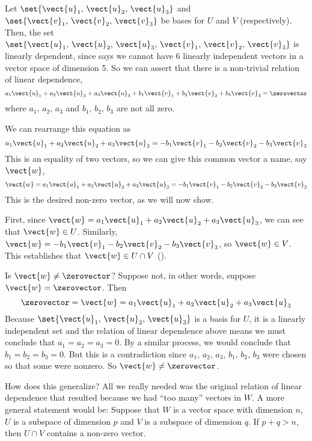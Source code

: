 Let $\set{\vect{u}_1,\,\vect{u}_2,\,\vect{u}_3}$ and $\set{\vect{v}_1,\,\vect{v}_2,\,\vect{v}_3}$ be bases for $U$ and $V$ (respectively).  Then, the set $\set{\vect{u}_1,\,\vect{u}_2,\,\vect{u}_3,\,\vect{v}_1,\,\vect{v}_2,\,\vect{v}_3}$ is linearly dependent, since  says we cannot have 6 linearly independent vectors in a vector space of dimension 5.  So we can assert that there is a non-trivial relation of linear dependence,
%
\begin{equation*}
a_1\vect{u}_1+a_2\vect{u}_2+a_3\vect{u}_3+b_1\vect{v}_1+b_2\vect{v}_2+b_3\vect{v}_3=\zerovector
\end{equation*}
%
where $a_1,\,a_2,\,a_3$ and $b_1,\,b_2,\,b_3$ are not all zero.\par
%
We can rearrange this equation as
%
\begin{equation*}
a_1\vect{u}_1+a_2\vect{u}_2+a_3\vect{u}_3=-b_1\vect{v}_1-b_2\vect{v}_2-b_3\vect{v}_3
\end{equation*}
%
This is an equality of two vectors, so we can give this common vector a name, say $\vect{w}$, 
%
\begin{equation*}
\vect{w}=a_1\vect{u}_1+a_2\vect{u}_2+a_3\vect{u}_3=-b_1\vect{v}_1-b_2\vect{v}_2-b_3\vect{v}_3
\end{equation*}
%
This is the desired non-zero vector, as we will now show.\par
%
First, since $\vect{w}=a_1\vect{u}_1+a_2\vect{u}_2+a_3\vect{u}_3$, we can see that $\vect{w}\in U$.  Similarly, $\vect{w}=-b_1\vect{v}_1-b_2\vect{v}_2-b_3\vect{v}_3$, so $\vect{w}\in V$.  This establishes that $\vect{w}\in U\cap V$ ().\par
%
Is $\vect{w}\neq\zerovector$?  Suppose not, in other words, suppose $\vect{w}=\zerovector$.  Then 
%
\begin{equation*}
\zerovector=\vect{w}=a_1\vect{u}_1+a_2\vect{u}_2+a_3\vect{u}_3
\end{equation*}
%
Because $\set{\vect{u}_1,\,\vect{u}_2,\,\vect{u}_3}$ is a basis for $U$, it is a linearly independent set and the relation of linear dependence above means we must conclude that $a_1=a_2=a_3=0$.  By a similar process, we would conclude that $b_1=b_2=b_3=0$.  But this is a contradiction since $a_1,\,a_2,\,a_3,\,b_1,\,b_2,\,b_3$ were chosen so that some were nonzero.  So $\vect{w}\neq\zerovector$.\par
%
How does this generalize?  All we really needed was the original relation of linear dependence that resulted because we had ``too many'' vectors in $W$.  A more general statement would be: Suppose that $W$ is a vector space with dimension $n$, $U$ is a subspace of dimension $p$ and $V$ is a subspace of dimension $q$.  If $p+q>n$, then $U\cap V$ contains a non-zero vector.
